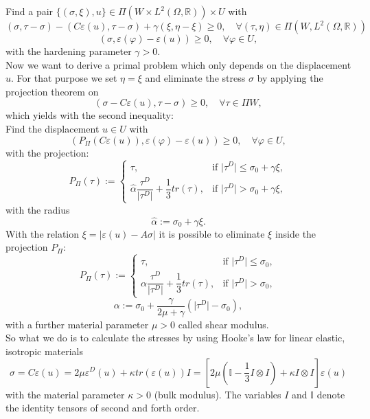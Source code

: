 \documentclass{article}
\begin{document}
Find a pair $\lbrace(\sigma,\xi),u\rbrace\in \Pi (W\times L^2(\Omega,\mathbb{R}))\times U$ with
$$\left(\sigma,\tau - \sigma\right) - \left(C\varepsilon(u), \tau - \sigma\right) + \gamma\left( \xi, \eta - \xi\right) \geq 0,\quad \forall (\tau,\eta)\in \Pi (W,L^2(\Omega,\mathbb{R}))$$
$$\left(\sigma,\varepsilon(\varphi) - \varepsilon(u)\right) \geq 0,\quad \forall \varphi\in U,$$
with the hardening parameter $\gamma > 0$.\\
Now we want to derive a primal problem which only depends on the displacement $u$. For that purpose we
set $\eta = \xi$ and eliminate the stress $\sigma$ by applying the projection theorem on\\
$$\left(\sigma - C\varepsilon(u), \tau - \sigma\right) \geq 0,\quad \forall \tau\in \Pi W,$$
which yields with the second inequality:\\
Find the displacement $u\in U$ with
$$\left(P_{\Pi}(C\varepsilon(u)),\varepsilon(\varphi) - \varepsilon(u)\right) \geq 0,\quad \forall \varphi\in U,$$
with the projection:
$$P_{\Pi}(\tau):=\begin{cases}
			\tau, & \text{if }\vert\tau^D\vert \leq \sigma_0 +  \gamma\xi,\\
			\hat\alpha\dfrac{\tau^D}{\vert\tau^D\vert} + \dfrac{1}{3}tr(\tau), & \text{if }\vert\tau^D\vert > \sigma_0 +  \gamma\xi,
			\end{cases}$$
with the radius
$$\hat\alpha := \sigma_0 + \gamma\xi .$$
With the relation $\xi = \vert\varepsilon(u) - A\sigma\vert$ it is possible to eliminate $\xi$ inside the projection $P_{\Pi}$:\\
$$P_{\Pi}(\tau):=\begin{cases}
			\tau, & \text{if }\vert\tau^D\vert \leq \sigma_0,\\
			\alpha\dfrac{\tau^D}{\vert\tau^D\vert} + \dfrac{1}{3}tr(\tau), & \text{if }\vert\tau^D\vert > \sigma_0,
			\end{cases}$$
$$\alpha := \sigma_0 + \dfrac{\gamma}{2\mu+\gamma}\left(\vert\tau^D\vert - \sigma_0\right) ,$$
with a further material parameter $\mu>0$ called shear modulus.\\
So what we do is to calculate the stresses by using Hooke's law for linear elastic,  isotropic materials
$$\sigma = C \varepsilon(u) = 2\mu \varepsilon^D(u) + \kappa tr(\varepsilon(u))I = \left[2\mu\left(\mathbb{I} -\dfrac{1}{3} I\otimes I\right) + \kappa I\otimes I\right]\varepsilon(u)$$
with the material parameter $\kappa>0$ (bulk modulus). The variables $I$ and $\mathbb{I}$ denote the identity tensors of second and forth order.\\
\end{document}

